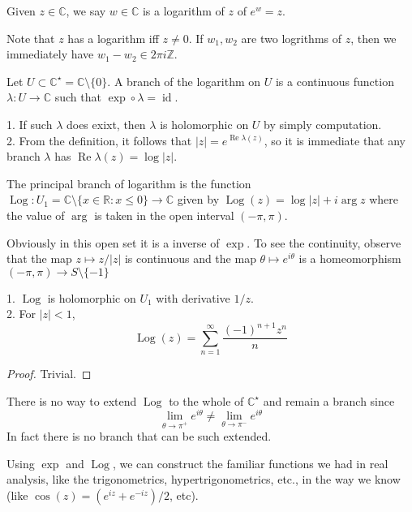 \begin{definition}
    Given $z\in\mathbb C$, we say $w\in\mathbb C$ is a logarithm of $z$ of $e^w=z$.
\end{definition}
Note that $z$ has a logarithm iff $z\neq 0$.
If $w_1,w_2$ are two logrithms of $z$, then we immediately have $w_1-w_2\in 2\pi i\mathbb Z$.
\begin{definition}
    Let $U\subset\mathbb C^\star=\mathbb C\setminus\{0\}$.
    A branch of the logarithm on $U$ is a continuous function $\lambda:U\to\mathbb C$ such that $\exp\circ\lambda=\operatorname{id}$.
\end{definition}
\begin{remark}
    1. If such $\lambda$ does exixt, then $\lambda$ is holomorphic on $U$ by simply computation.\\
    2. From the definition, it follows that $|z|=e^{\operatorname{Re}\lambda(z)}$, so it is immediate that any branch $\lambda$ has $\operatorname{Re}\lambda(z)=\log|z|$.
\end{remark}
\begin{definition}
    The principal branch of logarithm is the function $\operatorname{Log}:U_1=\mathbb C\setminus\{x\in\mathbb R:x\le 0\}\to\mathbb C$ given by $\operatorname{Log}(z)=\log|z|+i\arg z$ where the value of $\arg$ is taken in the open interval $(-\pi,\pi)$. 
\end{definition}
Obviously in this open set it is a inverse of $\exp$.
To see the continuity, observe that the map $z\mapsto z/|z|$ is continuous and the map $\theta\mapsto e^{i\theta}$ is a homeomorphism $(-\pi,\pi)\to S\setminus\{-1\}$
\begin{proposition}
    1. $\operatorname{Log}$ is holomorphic on $U_1$ with derivative $1/z$.\\
    2. For $|z|<1$,
    $$\operatorname{Log}(z)=\sum_{n=1}^\infty\frac{(-1)^{n+1}z^n}{n}$$
\end{proposition}
\begin{proof}
    Trivial.
\end{proof}
\begin{remark}
    There is no way to extend $\operatorname{Log}$ to the whole of $\mathbb C^\star$ and remain a branch since
    $$\lim_{\theta\to \pi^+}e^{i\theta}\neq\lim_{\theta\to \pi^-}e^{i\theta}$$
    In fact there is no branch that can be such extended.
\end{remark}
Using $\exp$ and $\operatorname{Log}$, we can construct the familiar functions we had in real analysis, like the trigonometrics, hypertrigonometrics, etc., in the way we know (like $\cos(z)=(e^{iz}+e^{-iz})/2$, etc).
